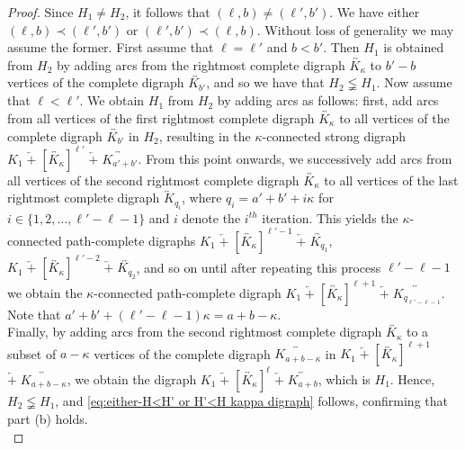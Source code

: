 \documentclass[a4paper,11pt]{article}
\begin{document}
\begin{proof}
Since $H_1 \neq H_2$, it follows that $(\ell,b)\neq (\ell',b')$. We have either  
$(\ell,b) \prec (\ell',b')$ or $(\ell',b') \prec (\ell,b)$. 
Without loss of generality we may assume the former. 
First assume that $\ell=\ell'$ and $b <b'$. Then $H_1$ is obtained from $H_2$ by 
adding arcs from the rightmost complete digraph $\overleftrightarrow{K_{\kappa}}$ to $b'-b$ vertices of the complete digraph $\overleftrightarrow{K_{b'}}$, and so we have that $H_2 \lneqq H_1$. Now assume that \(\ell < \ell'\).
We obtain \(H_1\) from \(H_2\) by adding arcs as follows: first, add arcs from all vertices of the first rightmost complete digraph $\overleftrightarrow{K_{\kappa}}$ to all vertices of the complete digraph \(\overleftrightarrow{K_{b'}}\) in \(H_2\), resulting in the $\kappa$-connected strong digraph \(K_1 \; \overleftarrow{+} \; [ \overleftrightarrow{K_\kappa}]^{\ell'} \; \overleftarrow{+} \; \overleftrightarrow{K_{a'+b'}}\). From this point onwards, we successively add arcs  from all vertices of the second rightmost complete digraph $\overleftrightarrow{K_{\kappa}}$ to all vertices of the last rightmost complete digraph \(\overleftrightarrow{K}_{q_{i}}\), where $q_i=a'+b'+i\kappa$ for $i \in \{1,2,\ldots,\ell'-\ell-1\}$ and $i$ denote the $i^{th}$ iteration. This yields the $\kappa$-connected path-complete digraphs \(K_1 \; \overleftarrow{+} \; [ \overleftrightarrow{K_\kappa}]^{\ell'-1} \; \overleftarrow{+} \; \overleftrightarrow{K_{q_1}}\), \(K_1 \; \overleftarrow{+} \; [ \overleftrightarrow{K_\kappa}]^{\ell'-2} \; \overleftarrow{+} \; \overleftrightarrow{K_{q_2}}\), and so on until after repeating this process $\ell'-\ell-1$ we obtain the $\kappa$-connected path-complete digraph
\(K_1 \; \overleftarrow{+} \; [ \overleftrightarrow{K_\kappa}]^{\ell + 1 } \; \overleftarrow{+} \; \overleftrightarrow{K_{q_{\ell'-\ell-1}}}\). Note that $a'+b'+(\ell'-\ell-1)\kappa = a+b-\kappa$.\\

Finally, by adding arcs from the second rightmost complete digraph $\overleftrightarrow{K_{\kappa}}$ to a subset of \(a - \kappa\) vertices of the complete digraph \(\overleftrightarrow{K_{a + b - \kappa}}\) in \(K_1 \; \overleftarrow{+} \; [ \overleftrightarrow{K_\kappa}]^{\ell + 1 }  \; \) \( \overleftarrow{+} \; \overleftrightarrow{K_{a+b-\kappa}}\), we obtain the digraph \(K_1 \; \overleftarrow{+} \; [ \overleftrightarrow{K_\kappa}]^{\ell} \; \overleftarrow{+} \; \overleftrightarrow{K_{a+b}}\), which is \(H_1\). Hence, \(H_2 \lneqq H_1\), and \eqref{eq:either-H<H' or H'<H kappa digraph} follows, confirming that part (b) holds.\\


\end{proof}
\end{document}
